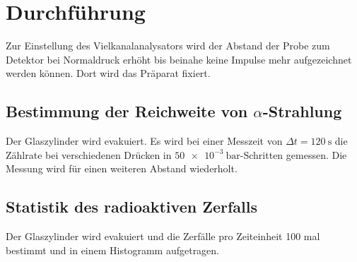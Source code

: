 \section{Durchführung}
\label{sec:Durchführung}

Zur Einstellung des Vielkanalanalysators wird der Abstand der Probe zum Detektor bei Normaldruck erhöht bis beinahe keine Impulse mehr aufgezeichnet werden können. Dort wird das Präparat fixiert.

\subsection{Bestimmung der Reichweite von $\alpha$-Strahlung}
Der Glaszylinder wird evakuiert. Es wird bei einer Messzeit von $\Delta t=\SI{120}{\second}$ die Zählrate bei verschiedenen Drücken in $\SI{50e-3}{\bar}$-Schritten gemessen.
Die Messung wird für einen weiteren Abstand wiederholt.

\subsection{Statistik des radioaktiven Zerfalls}
Der Glaszylinder wird evakuiert und die Zerfälle pro Zeiteinheit
100 mal bestimmt und in einem Histogramm aufgetragen.
